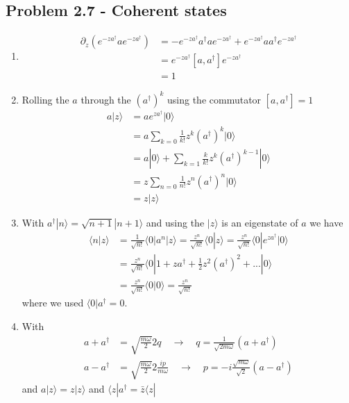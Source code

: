 \documentclass[../main.tex]{subfiles}
\begin{document}
\subsection{Problem 2.7 - Coherent states}
\begin{enumerate}
\item 
\begin{align}
    \partial_z\left(e^{-za^\dagger} a e^{-za^\dagger}\right)
    &=-e^{-za^\dagger}a^\dagger a e^{-za^\dagger}+e^{-za^\dagger} a a^\dagger e^{-za^\dagger}\\
    &=e^{-za^\dagger} [a,a^\dagger] e^{-za^\dagger}\\
    &=1
\end{align}
\item Rolling the $a$ through the $(a^\dagger)^k$ using the commutator $[a,a^\dagger]=1$
\begin{align}
    a|z\rangle
    &=a e^{za^\dagger}|0\rangle\\
    &=a\sum_{k=0}\frac{1}{k!}z^k(a^\dagger)^k|0\rangle\\
    &=a|0\rangle+\sum_{k=1}\frac{k}{k!}z^k(a^\dagger)^{k-1}|0\rangle\\
    &=z\sum_{n=0}\frac{1}{n!}z^n(a^\dagger)^{n}|0\rangle\\
    &=z|z\rangle
\end{align}
\item With $a^\dagger|n\rangle=\sqrt{n+1}|n+1\rangle$ and using the $|z\rangle$ is an eigenstate of $a$ we have
\begin{align}
    \langle n|z\rangle&=\frac{1}{\sqrt{n!}}\langle0|a^n|z\rangle
    =\frac{z^n}{\sqrt{n!}}\langle0|z\rangle
    =\frac{z^n}{\sqrt{n!}}\langle0|e^{za^\dagger}|0\rangle\\
    &=\frac{z^n}{\sqrt{n!}}\langle0|1+za^\dagger+\frac{1}{2}z^2(a^\dagger)^2+...|0\rangle\\
    &=\frac{z^n}{\sqrt{n!}}\langle0|0\rangle
    =\frac{z^n}{\sqrt{n!}}
\end{align}
where we used $\langle0|a^\dagger=0$.
\item With
\begin{align}
    a+a^\dagger&=\sqrt{\frac{m\omega}{2}}2q\quad\rightarrow\quad q=\frac{1}{\sqrt{2m\omega}}(a+a^\dagger)\\
    a-a^\dagger&=\sqrt{\frac{m\omega}{2}}2\frac{ip}{m\omega}\quad\rightarrow\quad p=-i\frac{\sqrt{m\omega}}{\sqrt{2}}(a-a^\dagger)
\end{align}
and $a|z\rangle=z|z\rangle$ and $\langle z|a^\dagger=\bar{z}\langle z|$ 
\begin{align}

\end{align}
\end{enumerate}
\end{document}
